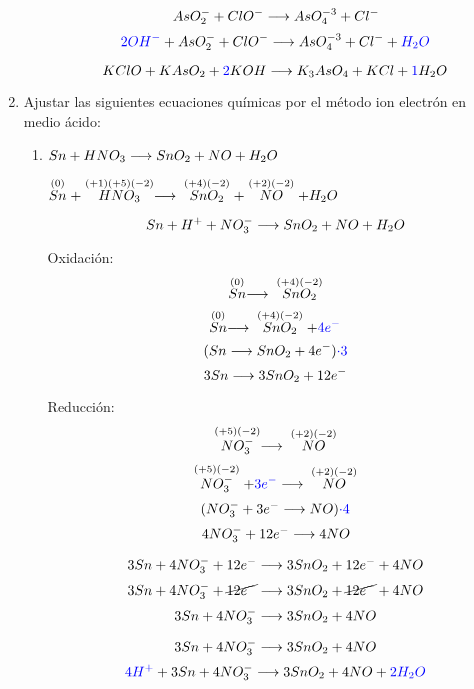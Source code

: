 \documentclass[../practica.root.tex]{subfiles}
\begin{document}
\begin{enumerate}
\begin{enumerate}
                    \[ AsO_2^- + ClO^- \longrightarrow{} AsO_4^{-3} + Cl^- \]
                    \[ \textcolor{blue}{2OH^-} + AsO_2^- + ClO^- \longrightarrow{} AsO_4^{-3} + Cl^- + \textcolor{blue}{H_2O} \]

                    \[ KClO + KAsO_2 + \textcolor{blue}{2} KOH \longrightarrow{} K_3AsO_4 + KCl + \textcolor{blue}{1} H_2O \]
          \end{enumerate}

    \item Ajustar las siguientes ecuaciones químicas por el método ion electrón en medio ácido:
          \begin{enumerate}
              \item $Sn + HNO_3 \longrightarrow{} SnO_2 + NO + H_2O$

                    $\stackrel{(0)}{Sn} + \stackrel{(+1)(+5)(-2)}{HNO_3} \longrightarrow{} \stackrel{(+4)(-2)}{SnO_2} + \stackrel{(+2)(-2)}{NO} + H_2O$

                    \[ Sn + H^+ + NO_3^- \longrightarrow{} SnO_2 + NO + H_2O \]

                    \begin{multicols}{2}
                        Oxidación:
                        \[ \stackrel{(0)}{Sn} \longrightarrow{} \stackrel{(+4)(-2)}{SnO_2} \]
                        \[ \stackrel{(0)}{Sn} \longrightarrow{} \stackrel{(+4)(-2)}{SnO_2} + \textcolor{blue}{4 e^-} \]
                        \[ (Sn \longrightarrow{} SnO_2 + 4 e^-)\textcolor{blue}{\cdot 3} \]
                        \[ 3 Sn \longrightarrow{} 3 SnO_2 + 12 e^- \]

                        \columnbreak

                        Reducción:
                        \[ \stackrel{(+5)(-2)}{NO_3^-} \longrightarrow{} \stackrel{(+2)(-2)}{NO} \]
                        \[ \stackrel{(+5)(-2)}{NO_3^-} + \textcolor{blue}{3e^-} \longrightarrow{} \stackrel{(+2)(-2)}{NO} \]
                        \[ (NO_3^- + 3e^- \longrightarrow{} NO)\textcolor{blue}{\cdot 4} \]
                        \[ 4 NO_3^- + 12 e^- \longrightarrow{} 4 NO \]
                    \end{multicols}

                    \[ 3 Sn + 4 NO_3^- + 12 e^- \longrightarrow{} 3 SnO_2 + 12 e^- + 4 NO \]
                    \[ 3 Sn + 4 NO_3^- + \cancel{12 e^-} \longrightarrow{} 3 SnO_2 + \cancel{12 e^-} + 4 NO \]
                    \[ 3 Sn + 4 NO_3^- \longrightarrow{} 3 SnO_2 + 4 NO \]

                    \[ 3 Sn + 4 NO_3^- \longrightarrow{} 3 SnO_2 + 4 NO \]
                    \[ \textcolor{blue}{4H^+} + 3 Sn + 4 NO_3^- \longrightarrow{} 3 SnO_2 + 4 NO + \textcolor{blue}{2H_2O} \]


\end{enumerate}
\end{enumerate}
\end{document}
